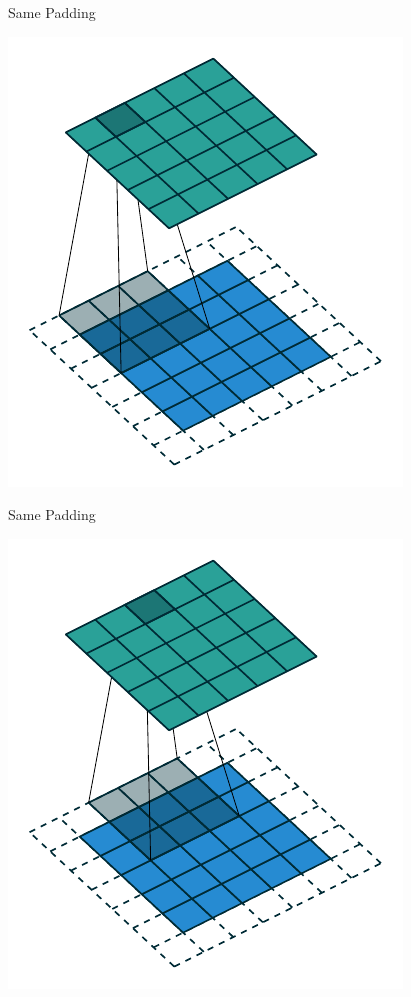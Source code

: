 \documentclass[10pt]{beamer}
\begin{document}
\begin{frame}{Same Padding}
\begin{center}
\includegraphics[scale=1]{images/same_padding_no_strides_01.pdf}
\end{center}
\end{frame}

\begin{frame}{Same Padding}
\begin{center}
\includegraphics[scale=1]{images/same_padding_no_strides_02.pdf}
\end{center}
\end{frame}
\end{document}
